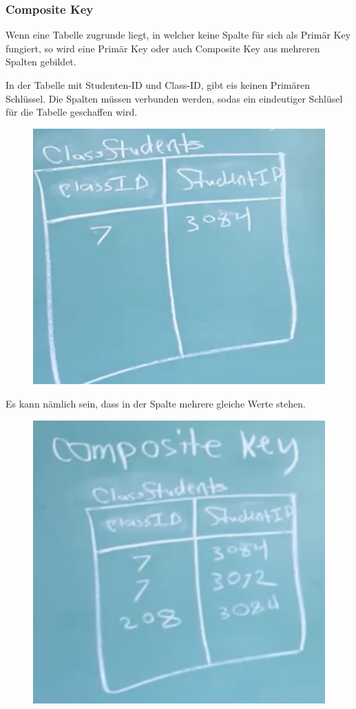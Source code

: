 \subsubsection{Composite Key}
Wenn eine Tabelle zugrunde liegt, in welcher keine Spalte für sich als Primär Key fungiert, so wird eine Primär Key oder auch Composite Key aus mehreren Spalten gebildet.

In der Tabelle mit Studenten-ID und Class-ID, gibt eis keinen Primären Schlüssel. Die Spalten müssen verbunden werden, sodas ein eindeutiger Schlüsel für die Tabelle geschaffen wird. 
\begin{figure}[H]
	\centering
	\includegraphics[scale = 0.3]{attachment/chapter_3/Scc031}
	\caption{}
	\label{fig:Scc031}
\end{figure}


Es kann nämlich sein, dass in der Spalte mehrere gleiche Werte stehen.

\begin{figure}[H]
	\centering
	\includegraphics[scale = 0.3]{attachment/chapter_3/Scc030}
	\caption{}
	\label{fig:Scc030}
\end{figure}

